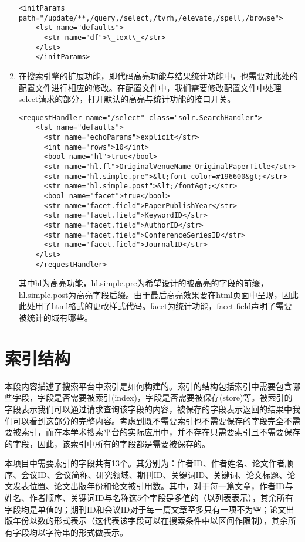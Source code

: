 \begin{enumerate}
    \begin{lstlisting}[caption={solrconfig.xml改动3}, label=ptszi3, escapeinside="", numbers=none]
    <initParams path="/update/**,/query,/select,/tvrh,/elevate,/spell,/browse">
    <lst name="defaults">
      <str name="df">\_text\_</str>
    </lst>
    </initParams>
    \end{lstlisting}
    \item 在搜索引擎的扩展功能，即代码高亮功能与结果统计功能中，也需要对此处的配置文件进行相应的修改。在配置文件中，我们需要修改配置文件中处理select请求的部分，打开默认的高亮与统计功能的接口开关。
    \begin{lstlisting}[caption={solrconfig.xml改动4}, label=ptszi4, escapeinside="", numbers=none]
    <requestHandler name="/select" class="solr.SearchHandler">
    <lst name="defaults">
      <str name="echoParams">explicit</str>
      <int name="rows">10</int>
      <bool name="hl">true</bool>
      <str name="hl.fl">OriginalVenueName OriginalPaperTitle</str>
      <str name="hl.simple.pre">&lt;font color=#196600&gt;</str>
      <str name="hl.simple.post">&lt;/font&gt;</str>
      <bool name="facet">true</bool>
      <str name="facet.field">PaperPublishYear</str>
      <str name="facet.field">KeywordID</str>
      <str name="facet.field">AuthorID</str>
      <str name="facet.field">ConferenceSeriesID</str>
      <str name="facet.field">JournalID</str>
    </lst>
    </requestHandler>
    \end{lstlisting}
    其中hl为高亮功能，hl.simple.pre为希望设计的被高亮的字段的前缀，hl.simple.post为高亮字段后缀。由于最后高亮效果要在html页面中呈现，因此此处用了html格式的更改样式代码。facet为统计功能，facet.field声明了需要被统计的域有哪些。
    \end{enumerate}


\section{索引结构}
    本段内容描述了搜索平台中索引是如何构建的。索引的结构包括索引中需要包含哪些字段，字段是否需要被索引(index)，字段是否需要被保存(store)等。被索引的字段表示我们可以通过请求查询该字段的内容，被保存的字段表示返回的结果中我们可以看到这部分的完整内容。考虑到既不需要索引也不需要保存的字段完全不需要被索引，而在本学术搜索平台的实际应用中，并不存在只需要索引且不需要保存的字段，因此，该索引中所有的字段都是需要被保存的。

    本项目中需要索引的字段共有13个。其分别为：作者ID、作者姓名、论文作者顺序、会议ID、会议简称、研究领域、期刊ID、关键词ID、关键词、论文标题、论文发表位置、论文出版年份和论文被引用数。其中，对于每一篇文章，作者ID与姓名、作者顺序、关键词ID与名称这5个字段是多值的（以列表表示），其余所有字段均是单值的；期刊ID和会议ID对于每一篇文章至多只有一项不为空；论文出版年份以数的形式表示（这代表该字段可以在搜索条件中以区间作限制），其余所有字段均以字符串的形式做表示。

